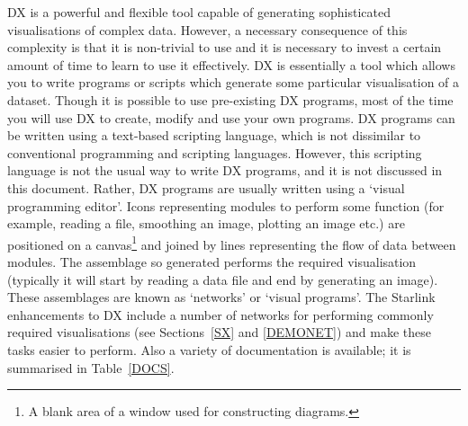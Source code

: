 DX is a powerful and flexible tool capable of generating sophisticated
visualisations of complex data. However, a necessary consequence of
this complexity is that it is non-trivial to use and it is necessary to
invest a certain amount of time to learn to use it effectively.
DX is essentially a tool which allows you to write programs or scripts
which generate some particular visualisation of a dataset. Though it is
possible to use pre-existing DX programs, most of the time you will use
DX to create, modify and use your own programs. DX programs can be
written using a text-based scripting language, which is not dissimilar
to conventional programming and scripting languages. However, this
scripting language is not the usual way to write DX programs, and it is
not discussed in this document. Rather, DX programs are usually written
using a `visual programming editor'. Icons representing modules to
perform some function (for example, reading a file, smoothing an image,
plotting an image etc.) are positioned on a canvas\footnote{A blank area
of a window used for constructing diagrams.} and joined by lines
representing the flow of data between modules. The assemblage so generated
performs the required visualisation (typically it will start by reading a
data file and end by generating an image). These assemblages are known as
`networks' or `visual programs'.  The Starlink enhancements to DX include
a number of networks for performing commonly required visualisations (see
Sections~\ref{SX} and \ref{DEMONET}) and make these tasks easier to perform.
Also a variety of documentation is available; it is summarised in
Table~\ref{DOCS}.


